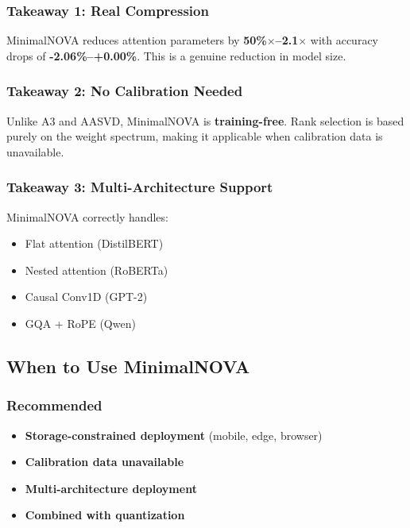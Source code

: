 \subsubsection{Takeaway 1: Real Compression}

MinimalNOVA reduces attention parameters by \textbf{50\%$\times$--2.1$\times$} 
with accuracy drops of \textbf{-2.06\%--+0.00\%}. This is a genuine 
reduction in model size.

\subsubsection{Takeaway 2: No Calibration Needed}

Unlike A3 and AASVD, MinimalNOVA is \textbf{training-free}. Rank selection is 
based purely on the weight spectrum, making it applicable when calibration 
data is unavailable.

\subsubsection{Takeaway 3: Multi-Architecture Support}

MinimalNOVA correctly handles:
\begin{itemize}
\item Flat attention (DistilBERT)
\item Nested attention (RoBERTa)
\item Causal Conv1D (GPT-2)
\item GQA + RoPE (Qwen)

\end{itemize}
\subsection{When to Use MinimalNOVA}

\subsubsection{Recommended}

\begin{itemize}
\item \textbf{Storage-constrained deployment} (mobile, edge, browser)
\item \textbf{Calibration data unavailable}
\item \textbf{Multi-architecture deployment}
\item \textbf{Combined with quantization}

\end{itemize}
